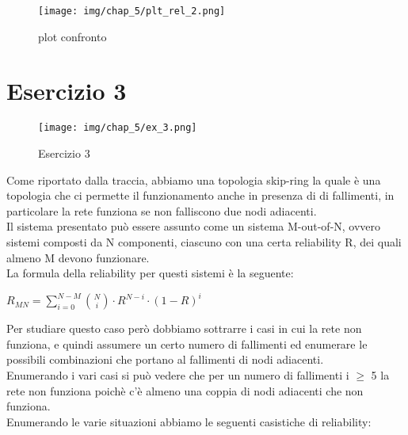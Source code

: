 \begin{figure}[H]
    \centering
    \texttt{[image: img/chap\_5/plt\_rel\_2.png]}
    \caption{plot confronto}
    \label{fig:plt_rel2}
\end{figure}
\noindent

\section{Esercizio 3}
\begin{figure}[H]
    \centering
    \texttt{[image: img/chap\_5/ex\_3.png]}
    \caption{Esercizio 3}
    \label{fig:ex_3}
\end{figure}
\noindent
Come riportato dalla traccia, abbiamo una topologia skip-ring la quale è una topologia che ci permette il funzionamento anche in presenza di di fallimenti, in particolare la rete funziona se non falliscono due nodi adiacenti.\\
Il sistema presentato può essere assunto come un sistema M-out-of-N, ovvero sistemi composti da N componenti, ciascuno con una certa reliability R, dei quali almeno M devono funzionare.\\
La formula della reliability per questi sistemi è la seguente:
\begin{center}
    $
    R_{MN} = \sum^{N-M}_{i=0} \binom{N}{i} \cdot R^{N-i} \cdot (1-R)^i
    $
\end{center}
Per studiare questo caso però dobbiamo sottrarre i casi in cui la rete non funziona, e quindi assumere un certo numero di fallimenti ed enumerare le possibili combinazioni che portano al fallimenti di nodi adiacenti.\\
Enumerando i vari casi si può vedere che per un numero di fallimenti i $\geq$ 5 la rete non funziona poichè c'è almeno una coppia di nodi adiacenti che non funziona.\\
Enumerando le varie situazioni abbiamo le seguenti casistiche di reliability:

